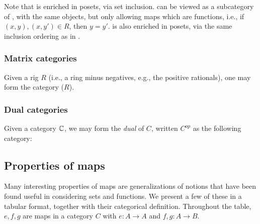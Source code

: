 Note that \rel is enriched in posets, via set inclusion. \Par can be viewed as a subcategory of
\rel, with the same objects, but only allowing maps which are functions, i.e., if $(x,y), (x,y')
\in R$, then $y = y'$. \Par is also enriched in posets, via the same inclusion ordering as in \rel.

\subsubsection{Matrix categories} %
\label{ssub:matrix_categories}
Given a rig $R$ (i.e., a ring minus negatives, e.g., the positive rationals), one may form the
category ($R$).

\subsubsection{Dual categories} %
\label{ssub:dual_categories}

Given a category $\mathbb{C}$, we may form the \emph{dual} of $C$, written $C^{op}$ as the following
category:

\subsection{Properties of maps} %
\label{sub:properties_of_maps}
Many interesting properties of maps are generalizations of notions that have been found useful in
considering sets and functions. We present a few of these in a tabular format, together with their
categorical definition. Throughout the table, $e,f,g$ are maps in a category $C$ with
$e:A \to A$ and $f,g:A \to B$.
\\[14pt]

